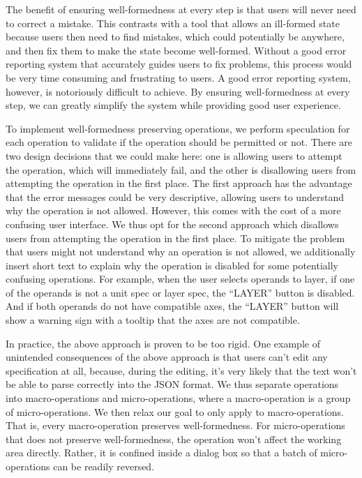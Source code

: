 \documentclass[journal]{vgtc}                %
\begin{document}
The benefit of ensuring well-formedness at every step is that users will never
need to correct a mistake. This contrasts with a tool that allows an ill-formed
state because users then need to find mistakes, which could potentially be anywhere,
and then fix them to make the state become well-formed. Without a good error reporting
system that accurately guides users to fix problems, this process would be very time
consuming and frustrating to users. A good error reporting system, however, is
notoriously difficult to achieve. By ensuring well-formedness at every step, we
can greatly simplify the system while providing good user experience.

To implement well-formedness preserving operations, we perform speculation for
each operation to validate if the operation should be permitted or not. There
are two design decisions that we could make here: one is allowing users to attempt
the operation, which will immediately fail, and the other is disallowing users
from attempting the operation in the first place. The first approach has the advantage
that the error messages could be very descriptive, allowing users to understand
why the operation is not allowed. However, this comes with the cost of a more
confusing user interface. We thus opt for the second approach which disallows
users from attempting the operation in the first place. To mitigate the problem
that users might not understand why an operation is not allowed, we additionally
insert short text to explain why the operation is disabled for some potentially
confusing operations. For example, when the user selects operands to layer, if
one of the operands is not a unit spec or layer spec, the “LAYER” button is
disabled. And if both operands do not have compatible axes, the “LAYER” button
will show a warning sign with a tooltip that the axes are not compatible.

In practice, the above approach is proven to be too rigid. One example of
unintended consequences of the above approach is that users can’t edit any
specification at all, because, during the editing, it’s very likely that
the text won’t be able to parse correctly into the JSON format. We thus
separate operations into macro-operations and micro-operations, where a
macro-operation is a group of micro-operations. We then relax our goal to
only apply to macro-operations. That is, every macro-operation preserves
well-formedness. For micro-operations that does not preserve well-formedness,
the operation won’t affect the working area directly. Rather, it is confined
inside a dialog box so that a batch of micro-operations can be readily reversed.
\end{document}
